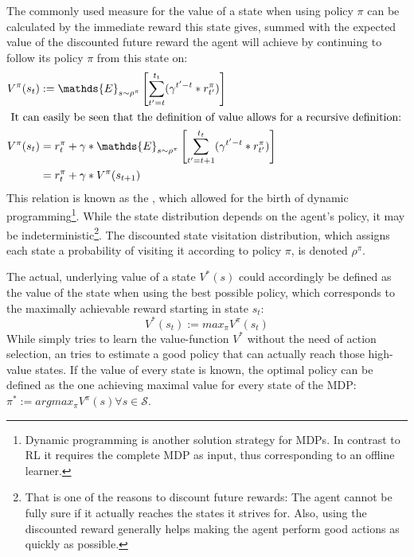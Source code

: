 The commonly used measure for the value of a state when using policy $\pi$ can be calculated by the immediate reward this state gives, summed with the expected value of the discounted future reward the agent will achieve by continuing to follow its policy $\pi$ from this state on:
\begin{align} 
	V^\pi(s_t) &:= \mathds{E}_{s\sim\rho^\pi} \left[  \sum_{t'=t}^{t_t} ( \gamma^{t'-t} * r^\pi_{t'} ) \right]  \label{eq:valuedefinition} \\
\intertext{	
It can easily be seen that the definition of value allows for a recursive definition:
}
	V^\pi(s_t) &= r_t^\pi + \gamma * \mathds{E}_{s\sim\rho^\pi} \left[  \sum_{t'=t+1}^{t_t} ( \gamma^{t'-t} * r^\pi_{t'} ) \right]  \nonumber \\
	&= r_t^\pi + \gamma * V^\pi(s_{t+1}) \label{statebellman}
\end{align}
This relation is known as the , which allowed for the birth of dynamic programming\footnote{Dynamic programming is another solution strategy for MDPs. In contrast to RL it requires the complete MDP as input, thus corresponding to an offline learner.}. While the state distribution depends on the agent's policy, it may be indeterministic\footnote{That is one of the reasons to discount future rewards: The agent cannot be fully sure if it actually reaches the states it strives for. Also, using the discounted reward generally helps making the agent perform good actions as quickly as possible.}. The discounted state visitation distribution, which assigns each state a probability of visiting it according to policy $\pi$, is denoted $\rho^\pi$. 

The actual, underlying value of a state $V^*(s)$ could accordingly be defined as the value of the state when using the best possible policy, which corresponds to the maximally achievable reward starting in state $s_t$:
\begin{equation*} 
V^*(s_t) := max_\pi V^\pi(s_t)
\end{equation*}
While  simply tries to learn the value-function $V^*$ without the need of action selection, an  tries to estimate a good policy that can actually reach those high-value states. If the value of every state is known, the optimal policy can be defined as the one achieving maximal value for every state of the MDP: \mbox{$\pi^* := argmax_\pi V^\pi(s) \forall s \in \mathcal{S}$}. 


